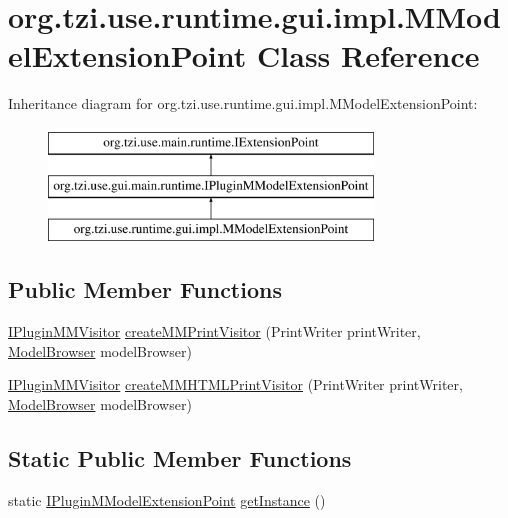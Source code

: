 \hypertarget{classorg_1_1tzi_1_1use_1_1runtime_1_1gui_1_1impl_1_1_m_model_extension_point}{\section{org.\-tzi.\-use.\-runtime.\-gui.\-impl.\-M\-Model\-Extension\-Point Class Reference}
\label{classorg_1_1tzi_1_1use_1_1runtime_1_1gui_1_1impl_1_1_m_model_extension_point}
}
Inheritance diagram for org.\-tzi.\-use.\-runtime.\-gui.\-impl.\-M\-Model\-Extension\-Point\-:\begin{figure}[H]
\begin{center}
\leavevmode
\includegraphics[height=3.000000cm]{classorg_1_1tzi_1_1use_1_1runtime_1_1gui_1_1impl_1_1_m_model_extension_point}
\end{center}
\end{figure}
\subsection*{Public Member Functions}
\begin{DoxyCompactItemize}
\item 
\hyperlink{interfaceorg_1_1tzi_1_1use_1_1gui_1_1main_1_1runtime_1_1_i_plugin_m_m_visitor}{I\-Plugin\-M\-M\-Visitor} \hyperlink{classorg_1_1tzi_1_1use_1_1runtime_1_1gui_1_1impl_1_1_m_model_extension_point_a5094917ad652a711f460df2c14dd3ef3}{create\-M\-M\-Print\-Visitor} (Print\-Writer print\-Writer, \hyperlink{classorg_1_1tzi_1_1use_1_1gui_1_1main_1_1_model_browser}{Model\-Browser} model\-Browser)
\item 
\hyperlink{interfaceorg_1_1tzi_1_1use_1_1gui_1_1main_1_1runtime_1_1_i_plugin_m_m_visitor}{I\-Plugin\-M\-M\-Visitor} \hyperlink{classorg_1_1tzi_1_1use_1_1runtime_1_1gui_1_1impl_1_1_m_model_extension_point_a1f98770c912f20fd98b494ea8cd5c99d}{create\-M\-M\-H\-T\-M\-L\-Print\-Visitor} (Print\-Writer print\-Writer, \hyperlink{classorg_1_1tzi_1_1use_1_1gui_1_1main_1_1_model_browser}{Model\-Browser} model\-Browser)
\end{DoxyCompactItemize}
\subsection*{Static Public Member Functions}
\begin{DoxyCompactItemize}
\item 
static \hyperlink{interfaceorg_1_1tzi_1_1use_1_1gui_1_1main_1_1runtime_1_1_i_plugin_m_model_extension_point}{I\-Plugin\-M\-Model\-Extension\-Point} \hyperlink{classorg_1_1tzi_1_1use_1_1runtime_1_1gui_1_1impl_1_1_m_model_extension_point_a07b34675df8d194469725790564f42f4}{get\-Instance} ()
\end{DoxyCompactItemize}


